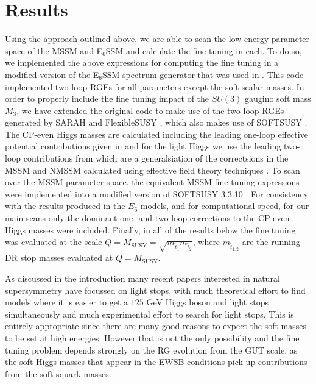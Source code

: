 \documentclass[preprint,amsmath,amssymb,aps,superscriptaddress,prd,
showpacs,floatfix,nofootinbib]{revtex4-1}
\begin{document}
\section{\label{sec:results}Results}

Using the approach outlined above, we are able to scan the low energy
parameter space of the MSSM and E$_6$SSM and calculate the fine tuning
in each.  To do so, we implemented the above expressions for computing
the fine tuning in a modified version of the E$_6$SSM spectrum
generator that was used in \cite{Athron:2013ipa}.  This code
implemented two-loop RGEs for all parameters except the soft scalar
masses.  In order to properly include the fine tuning impact of the
$SU(3)$ gaugino soft mass $M_3$, we have extended the original code to
make use of the two-loop RGEs generated by SARAH \cite{Staub:2009bi,
  Staub:2010jh, Staub:2012pb, Staub:2013tta} and FlexibleSUSY
\cite{Athron:2014yba}, which also makes use of SOFTSUSY
\cite{Allanach:2001kg, Allanach:2013kza}.  The CP-even Higgs masses
are calculated including the leading one-loop effective potential
contributions given in \cite{Athron:2009bs} and for the light Higgs we
use the leading two-loop contributions from \cite{King:2005jy} which
are a generalsiation of the correctsions in the MSSM and NMSSM
calculated using effective field theory techniques
\cite{Carena:1995wu,Ellwanger:1999ji}.  To scan over the MSSM
parameter space, the equivalent MSSM fine tuning expressions were
implemented into a modified version of SOFTSUSY 3.3.10
\cite{Allanach:2001kg}.  For consistency with the results produced in
the $E_6$ models, and for computational speed, for our main scans only
the dominant one- and two-loop corrections to the CP-even Higgs masses
were included.  Finally, in all of the results below the fine tuning
was evaluated at the scale $Q = M_{\textrm{SUSY}} =
\sqrt{m_{\tilde{t}_1}m_{\tilde{t}_2}}$, where $m_{\tilde{t}_{1,2}}$
are the running $\overline{\textrm{DR}}$ stop masses evaluated at $Q =
M_{\textrm{SUSY}}$.

As discussed in the introduction many recent papers interested in
natural supersymmetry have focussed on light stops, with much
theoretical effort to find models where it is easier to get a $125$
GeV Higgs boson and light stops simultaneously and much experimental
effort to search for light stops.  This is entirely appropriate since
there are many good reasons to expect the soft masses to be set at
high energies.  However that is not the only possibility and the fine
tuning problem depends strongly on the RG evolution from the GUT
scale, as the soft Higgs masses that appear in the EWSB conditions
pick up contributions from the soft squark masses.
\end{document}
